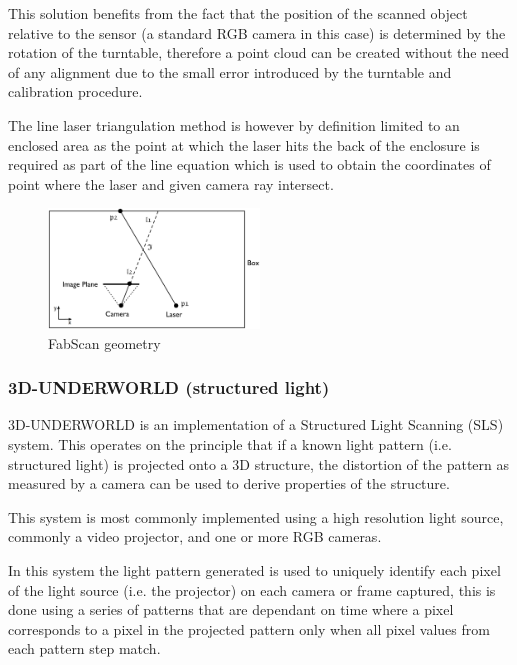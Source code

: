 \documentclass{entcs}
\begin{document}
This solution benefits from the fact that the position of the scanned object
relative to the sensor (a standard RGB camera in this case) is determined by the
rotation of the turntable, therefore a point cloud can be created without the
need of any alignment due to the small error introduced by the turntable and
calibration procedure.

The line laser triangulation method is however by definition limited to an
enclosed area as the point at which the laser hits the back of the enclosure
is required as part of the line equation which is used to obtain the coordinates
of point where the laser and given camera ray intersect.

\begin{figure}[h!]
  \centering
  \includegraphics[width=0.5\textwidth]{graphics/fabscan_geometry.eps}
  \caption{FabScan geometry \cite{Engelmann2011}}
  \label{fig:fabscan_geometry}
\end{figure}

\subsubsection{3D-UNDERWORLD (structured light)}

3D-UNDERWORLD \cite{Gu2014} is an implementation of a Structured Light Scanning
(SLS) system.  This operates on the principle that if a known light pattern
(i.e. structured light) is projected onto a 3D structure, the distortion of the
pattern as measured by a camera can be used to derive properties of the
structure.

This system is most commonly implemented using a high resolution light source,
commonly a video projector, and one or more RGB cameras.

In this system the light pattern generated is used to uniquely identify each
pixel of the light source (i.e. the projector) on each camera or frame captured,
this is done using a series of patterns that are dependant on time where a pixel
corresponds to a pixel in the projected pattern only when all pixel values from
each pattern step match.
\end{document}
